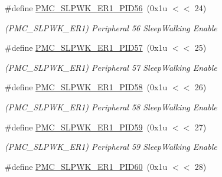 \begin{DoxyCompactItemize}
\mbox{\label{group__SAME70__PMC_ga9792ce89c425d8a5f48138e4c2d9207a}} 
\#define \mbox{\hyperlink{group__SAME70__PMC_ga9792ce89c425d8a5f48138e4c2d9207a}{P\+M\+C\+\_\+\+S\+L\+P\+W\+K\+\_\+\+E\+R1\+\_\+\+P\+I\+D56}}~(0x1u $<$$<$ 24)
\begin{DoxyCompactList}\small\item\em (P\+M\+C\+\_\+\+S\+L\+P\+W\+K\+\_\+\+E\+R1) Peripheral 56 Sleep\+Walking Enable \end{DoxyCompactList}\item 
\mbox{\label{group__SAME70__PMC_gab571b69744492177d28d2cd369fc9557}} 
\#define \mbox{\hyperlink{group__SAME70__PMC_gab571b69744492177d28d2cd369fc9557}{P\+M\+C\+\_\+\+S\+L\+P\+W\+K\+\_\+\+E\+R1\+\_\+\+P\+I\+D57}}~(0x1u $<$$<$ 25)
\begin{DoxyCompactList}\small\item\em (P\+M\+C\+\_\+\+S\+L\+P\+W\+K\+\_\+\+E\+R1) Peripheral 57 Sleep\+Walking Enable \end{DoxyCompactList}\item 
\mbox{\label{group__SAME70__PMC_ga7fdf8770dbdad26596591bc1cee4dcbd}} 
\#define \mbox{\hyperlink{group__SAME70__PMC_ga7fdf8770dbdad26596591bc1cee4dcbd}{P\+M\+C\+\_\+\+S\+L\+P\+W\+K\+\_\+\+E\+R1\+\_\+\+P\+I\+D58}}~(0x1u $<$$<$ 26)
\begin{DoxyCompactList}\small\item\em (P\+M\+C\+\_\+\+S\+L\+P\+W\+K\+\_\+\+E\+R1) Peripheral 58 Sleep\+Walking Enable \end{DoxyCompactList}\item 
\mbox{\label{group__SAME70__PMC_ga1519c9318deeedd834662d5ad7374bf1}} 
\#define \mbox{\hyperlink{group__SAME70__PMC_ga1519c9318deeedd834662d5ad7374bf1}{P\+M\+C\+\_\+\+S\+L\+P\+W\+K\+\_\+\+E\+R1\+\_\+\+P\+I\+D59}}~(0x1u $<$$<$ 27)
\begin{DoxyCompactList}\small\item\em (P\+M\+C\+\_\+\+S\+L\+P\+W\+K\+\_\+\+E\+R1) Peripheral 59 Sleep\+Walking Enable \end{DoxyCompactList}\item 
\mbox{\label{group__SAME70__PMC_ga780fe16c095a2bc0502c5a43bebea374}} 
\#define \mbox{\hyperlink{group__SAME70__PMC_ga780fe16c095a2bc0502c5a43bebea374}{P\+M\+C\+\_\+\+S\+L\+P\+W\+K\+\_\+\+E\+R1\+\_\+\+P\+I\+D60}}~(0x1u $<$$<$ 28)
$$
\end{DoxyCompactItemize}
